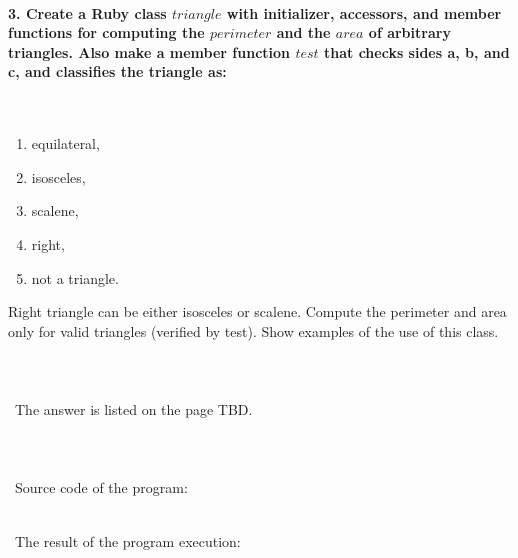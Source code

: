 \documentclass{article}
\begin{document}
\paragraph{3. Create a Ruby class \(triangle\) with initializer, accessors, and member functions for computing the \(perimeter\) and the \(area\) of arbitrary triangles. Also make a member function \(test\) that checks sides a, b, and c, and classifies the triangle as: }\

\begin{enumerate}[label=(\arabic*)]
	\item equilateral,
	\item isosceles,
	\item scalene,
	\item right,
	\item not a triangle.
\end{enumerate}

Right triangle can be either isosceles or scalene. Compute the perimeter and area only for valid triangles (verified by test). Show examples of the use of this class.

\paragraph{}\
\paragraph{}\
	The answer is listed on the page TBD.
\paragraph{}\
\paragraph{}\
Source code of the program:

\begin{verbatim}

\end{verbatim}

\paragraph{}\
	The result of the program execution:
	
\begin{verbatim} 

\end{verbatim}
\end{document}
